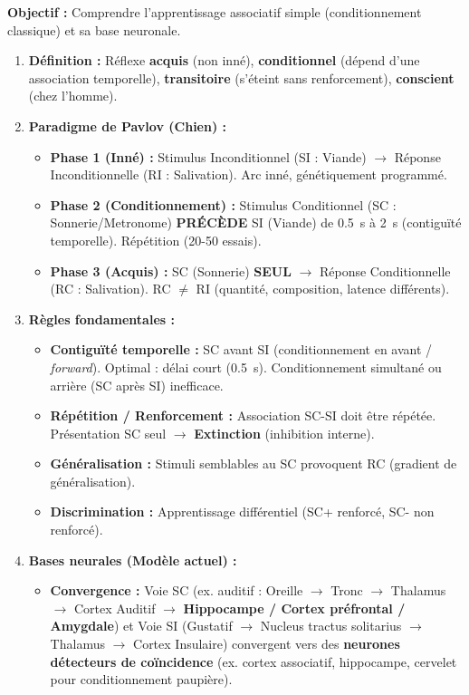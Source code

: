 \documentclass[11pt]{article}
\begin{document}
\begin{methode}
\textbf{Objectif :} Comprendre l'apprentissage associatif simple (conditionnement classique) et sa base neuronale.
\begin{enumerate}
    \item \textbf{Définition :} Réflexe \textbf{acquis} (non inné), \textbf{conditionnel} (dépend d'une association temporelle), \textbf{transitoire} (s'éteint sans renforcement), \textbf{conscient} (chez l'homme).
    \item \textbf{Paradigme de Pavlov (Chien) :}
    \begin{itemize}
        \item \textbf{Phase 1 (Inné) :} Stimulus Inconditionnel (SI : Viande) $\rightarrow$ Réponse Inconditionnelle (RI : Salivation). Arc inné, génétiquement programmé.
        \item \textbf{Phase 2 (Conditionnement) :} Stimulus Conditionnel (SC : Sonnerie/Metronome) \textbf{PRÉCÈDE} SI (Viande) de \SI{0,5}{s} à \SI{2}{s} (contiguïté temporelle). Répétition (20-50 essais).
        \item \textbf{Phase 3 (Acquis) :} SC (Sonnerie) \textbf{SEUL} $\rightarrow$ Réponse Conditionnelle (RC : Salivation). RC $\neq$ RI (quantité, composition, latence différents).
    \end{itemize}
    \item \textbf{Règles fondamentales :}
    \begin{itemize}
        \item \textbf{Contiguïté temporelle :} SC avant SI (conditionnement en avant / \textit{forward}). Optimal : délai court (\SI{0,5}{s}). Conditionnement simultané ou arrière (SC après SI) inefficace.
        \item \textbf{Répétition / Renforcement :} Association SC-SI doit être répétée. Présentation SC seul $\rightarrow$ \textbf{Extinction} (inhibition interne).
        \item \textbf{Généralisation :} Stimuli semblables au SC provoquent RC (gradient de généralisation).
        \item \textbf{Discrimination :} Apprentissage différentiel (SC+ renforcé, SC- non renforcé).
    \end{itemize}
    \item \textbf{Bases neurales (Modèle actuel) :}
    \begin{itemize}
        \item \textbf{Convergence :} Voie SC (ex. auditif : Oreille $\rightarrow$ Tronc $\rightarrow$ Thalamus $\rightarrow$ Cortex Auditif $\rightarrow$ \textbf{Hippocampe / Cortex préfrontal / Amygdale}) et Voie SI (Gustatif $\rightarrow$ Nucleus tractus solitarius $\rightarrow$ Thalamus $\rightarrow$ Cortex Insulaire) convergent vers des \textbf{neurones détecteurs de coïncidence} (ex. cortex associatif, hippocampe, cervelet pour conditionnement paupière).

\end{itemize}
\end{enumerate}
\end{methode}
\end{document}
